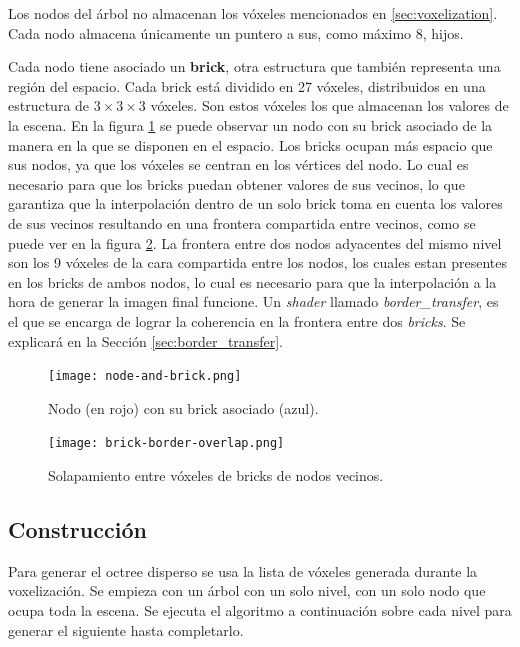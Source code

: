 Los nodos del árbol no almacenan los vóxeles mencionados en \ref{sec:voxelization}.
Cada nodo almacena únicamente un puntero a sus, como máximo $8$, hijos.

Cada nodo tiene asociado un \textbf{brick}, otra estructura que también representa una región del espacio.
Cada brick está dividido en 27 vóxeles, distribuidos en una estructura de $3\times3\times3$ vóxeles.
Son estos vóxeles los que almacenan los valores de la escena.
En la figura \ref{fig:node_and_brick} se puede observar un nodo con su brick asociado de la manera en la que se disponen en el espacio.
Los bricks ocupan más espacio que sus nodos, ya que los vóxeles se centran en los vértices del nodo.
Lo cual es necesario para que los bricks puedan obtener valores de sus vecinos, lo que garantiza que la interpolación dentro de un solo brick toma en cuenta los valores de sus vecinos resultando en una frontera compartida entre vecinos, como se puede ver en la figura \ref{fig:brick_border_overlap}.
La frontera entre dos nodos adyacentes del mismo nivel son los 9 vóxeles de la cara compartida entre los nodos, los cuales estan presentes en los bricks de ambos nodos, lo cual es necesario para que la interpolación a la hora de generar la imagen final funcione.
Un \textit{shader} llamado \textit{border\_transfer}, es el que se encarga de lograr la coherencia en la frontera entre dos \textit{bricks}.
Se explicará en la Sección \ref{sec:border_transfer}.

\begin{figure}[h!]
    \centering
    \texttt{[image: node-and-brick.png]}
    \caption{Nodo (en rojo) con su brick asociado (azul).}
    \label{fig:node_and_brick}
\end{figure}

\begin{figure}[h!]
    \centering
    \texttt{[image: brick-border-overlap.png]}
    \caption{Solapamiento entre vóxeles de bricks de nodos vecinos.}
    \label{fig:brick_border_overlap}
\end{figure}

\subsection{Construcción}\label{design:svo_construction}

Para generar el octree disperso se usa la lista de vóxeles generada durante la voxelización.
Se empieza con un árbol con un solo nivel, con un solo nodo que ocupa toda la escena.
Se ejecuta el algoritmo a continuación sobre cada nivel para generar el siguiente hasta completarlo.

